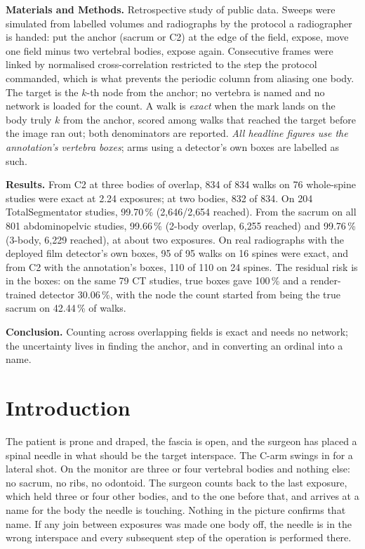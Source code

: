 \documentclass[11pt,letterpaper]{article}
\begin{document}
\noindent\textbf{Materials and Methods.} Retrospective study of public data. Sweeps were simulated from
labelled volumes and radiographs by the protocol a radiographer is handed: put the anchor (sacrum or C2)
at the edge of the field, expose, move one field minus two vertebral bodies, expose again. Consecutive
frames were linked by normalised cross-correlation restricted to the step the protocol commanded, which is
what prevents the periodic column from aliasing one body. The target is the $k$-th node from the anchor;
no vertebra is named and no network is loaded for the count. A walk is \emph{exact} when the mark lands on
the body truly $k$ from the anchor, scored among walks that reached the target before the image ran out;
both denominators are reported. \emph{All headline figures use the annotation's vertebra boxes}; arms
using a detector's own boxes are labelled as such.

\noindent\textbf{Results.} From C2 at three bodies of overlap, 834 of 834 walks on 76 whole-spine studies
were exact at 2.24 exposures; at two bodies, 832 of 834. On 204 TotalSegmentator studies, 99.70\,\%
(2{,}646/2{,}654 reached). From the sacrum on all 801 abdominopelvic studies, 99.66\,\% (2-body overlap,
6{,}255 reached) and 99.76\,\% (3-body, 6{,}229 reached), at about two exposures. On real radiographs with
the deployed film detector's own boxes, 95 of 95 walks on 16 spines were exact, and from C2 with the
annotation's boxes, 110 of 110 on 24 spines. The residual risk is in the boxes: on the same 79 CT studies,
true boxes gave 100\,\% and a render-trained detector 30.06\,\%, with the node the count started from being
the true sacrum on 42.44\,\% of walks.

\noindent\textbf{Conclusion.} Counting across overlapping fields is exact and needs no network; the
uncertainty lives in finding the anchor, and in converting an ordinal into a name.

\section*{Introduction}

The patient is prone and draped, the fascia is open, and the surgeon has placed a spinal needle in what
should be the target interspace. The C-arm swings in for a lateral shot. On the monitor are three or four
vertebral bodies and nothing else: no sacrum, no ribs, no odontoid. The surgeon counts back to the last
exposure, which held three or four other bodies, and to the one before that, and arrives at a name for the
body the needle is touching. Nothing in the picture confirms that name. If any join between exposures was
made one body off, the needle is in the wrong interspace and every subsequent step of the operation is
performed there.
\end{document}
